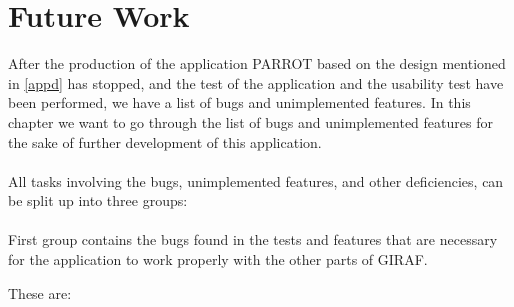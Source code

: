 \chapter{Future Work}

After the production of the application PARROT based on the design mentioned in \autoref{appd} has stopped, and the test of the application and the usability test have been performed, we have a list of bugs and unimplemented features.\newline
In this chapter we want to go through the list of bugs and unimplemented features for the sake of further development of this application.\\
\\
All tasks involving the bugs, unimplemented features, and other deficiencies, can be split up into three groups:\\
\\
First group contains the bugs found in the tests and features that are necessary for the application to work properly with the other parts of GIRAF.\newline 

These are:

